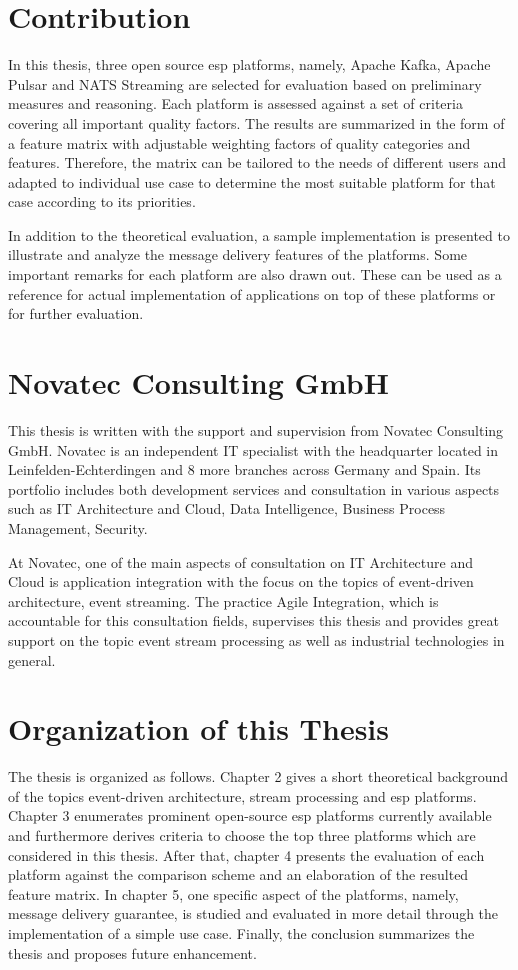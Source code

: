 \section{Contribution}
In this thesis, three open source \acrshort{esp} platforms, namely, Apache Kafka, Apache Pulsar and NATS Streaming are selected for evaluation based on preliminary measures and reasoning. Each platform is assessed against a set of criteria covering all important quality factors. The results are summarized in the form of a feature matrix with adjustable weighting factors of quality categories and features. Therefore, the matrix can be tailored to the needs of different users and adapted to individual use case to determine the most suitable platform for that case according to its priorities.

In addition to the theoretical evaluation, a sample implementation is presented to illustrate and analyze the message delivery features of the platforms. Some important remarks for each platform are also drawn out. These can be used as a reference for actual implementation of applications on top of these platforms or for further evaluation.
\section{Novatec Consulting GmbH}
This thesis is written with the support and supervision from Novatec Consulting GmbH. Novatec is an independent IT specialist with the headquarter located in Leinfelden-Echterdingen and 8 more branches across Germany and Spain. Its portfolio includes both development services and consultation in various aspects such as IT Architecture and Cloud, Data Intelligence, Business Process Management, Security.

At Novatec, one of the main aspects of consultation on IT Architecture and Cloud is application integration with the focus on the topics of event-driven architecture, event streaming. The practice Agile Integration, which is accountable for this consultation fields, supervises this thesis and provides great support on the topic event stream processing as well as industrial technologies in general. 

\section{Organization of this Thesis}
The thesis is organized as follows. Chapter 2 gives a short theoretical background of the topics event-driven architecture, stream processing and \acrshort{esp} platforms. Chapter 3 enumerates prominent open-source \acrshort{esp} platforms currently available and furthermore derives criteria to choose the top three platforms which are considered in this thesis. After that, chapter 4 presents the evaluation of each platform against the comparison scheme and an elaboration of the resulted feature matrix. In chapter 5, one specific aspect of the platforms, namely, message delivery guarantee, is studied and evaluated in more detail through the implementation of a simple use case. Finally, the conclusion summarizes the thesis and proposes future enhancement.

